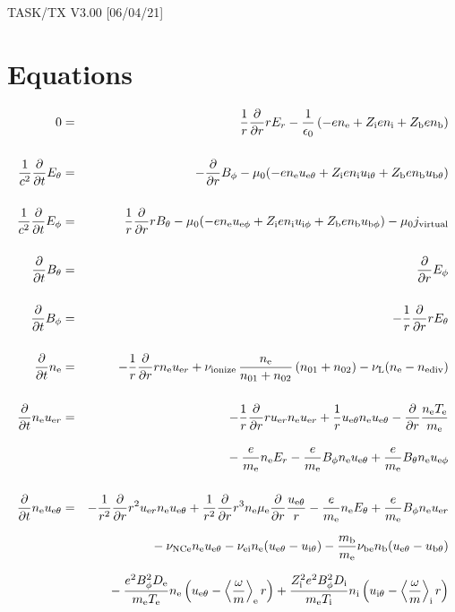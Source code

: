 \documentclass[11pt]{article}
\def\r#1{{\rm#1}}
\def\ddt{\frac{\partial}{\partial t}}
\def\ddr{\frac{\partial}{\partial r}}
\def\ave#1{\left\langle#1\right\rangle}
\def\me{m_\r{e}}
\def\mb{m_\r{b}}
\def\mue{\mu_\r{e}}
\def\De{D_\r{e}}
\def\Di{D_\r{i}}
\def\ne{n_\r{e}}
\def\ni{n_\r{i}}
\def\nb{n_\r{b}}
\def\uer{u_{\r{e}r}}
\def\ueth{u_{\r{e}\theta}}
\def\uith{u_{\r{i}\theta}}
\def\ubth{u_{\r{b}\theta}}
\def\ueph{u_{\r{e}\phi}}
\def\uiph{u_{\r{i}\phi}}
\def\ubph{u_{\r{b}\phi}}
\def\Er{E_r}
\def\Eth{E_\theta}
\def\Eph{E_\phi}
\def\Bth{B_\theta}
\def\Bph{B_\phi}
\def\Te{T_\r{e}}
\def\Ti{T_\r{i}}
\def\nna{n_{01}}
\def\nnb{n_{02}}
\def\Zi{Z_\r{i}}
\def\Zb{Z_\r{b}}
\def\nuNCe{\nu_\r{NCe}}
\def\nuL{\nu_\r{L}}
\def\nuion{\nu_\r{ionize}}
\def\nediv{n_\r{ediv}}
\newcommand{\Frac}[2]{%
  {\displaystyle {\displaystyle #1\over \displaystyle #2}}%
}
\newcommand{\rdprd}[2]{\Frac{\partial #1}{\partial #2}}
\newcommand{\aveaveB}[1]{\left< \!\! \left< #1 \right> \!\! \right>}
\begin{document}
\begin{center}
TASK/TX V3.00 [06/04/21]
\end{center}

\section{Equations}
\vspace{-5mm}

\begin{eqnarray}
%
%
  0 &=&
%
  \frac{1}{r} \ddr r \Er
%
 - \frac{1}{\epsilon_0}
  \left(-e \ne + \Zi e \ni + \Zb e \nb \right)
\\[5mm]
%
%
  \frac{1}{c^2} \ddt \Eth &=&
%
  - \ddr \Bph
%
  - \mu_0 (-e \ne \ueth + \Zi e \ni \uith + \Zb e \nb \ubth)
\\[5mm]
%
%
  \frac{1}{c^2} \ddt \Eph &=&
%
  \frac{1}{r} \ddr r \Bth
%
  - \mu_0 (-e \ne \ueph + \Zi e \ni \uiph + \Zb e \nb \ubph) - \mu_0 j_\r{virtual}
\\[5mm]
%
%
  \ddt \Bth &=&
%
  \ddr \Eph
\\[5mm]
%
%
  \ddt \Bph &=&
%
  - \frac{1}{r} \ddr r \Eth
\\[5mm]
%
%
  \ddt\ne &=&
%
  - \frac{1}{r} \ddr r \ne \uer 
%
  + \nuion\, \frac{\ne}{\nna+\nnb}\, (\nna+\nnb)
%
  - \nuL (\ne - \nediv)
\\[5mm]
%
%
  \ddt \ne \uer &=&
%
  - \frac{1}{r} \ddr r \uer \ne \uer
%
  + \frac{1}{r} \ueth \ne \ueth
%
  - \ddr \frac{\ne \Te}{\me}
\nonumber\\[3mm]&&{}
%
  - \frac{e}{\me} \ne \Er
%
  - \frac{e}{\me} \Bph \ne \ueth
%
  + \frac{e}{\me} \Bth \ne \ueph
\\[5mm]
%
%
  \ddt \ne \ueth &=&
%
  - \frac{1}{r^2} \ddr r^2 \uer \ne \ueth
%
  + \frac{1}{r^2} \ddr r^3 \ne \mue \ddr \frac{\ueth}{r}
%
  - \frac{e}{\me} \ne \Eth
%
  + \frac{e}{\me} \Bph \ne \uer
\nonumber\\[2.5mm]&&{}
%
  - \nuNCe \ne \ueth
%
  - \nu_\r{ei} \ne (\ueth - \uith)
%
  - \frac{\mb}{\me} \nu_\r{be} \nb (\ueth - \ubth)
\nonumber\\[2.5mm]&&{}
%
  - \frac{e^2 \Bph^2 \De}{\me\Te}\ne
    \left(\ueth - \ave{\frac{\omega}{m}}_\r{e} r \right)
%
   + \frac{\Zi^2 e^2 \Bph^2 \Di}{\me\Ti}\ni
    \left(\uith - \ave{\frac{\omega}{m}}_\r{i} r \right)
\nonumber\\[2.5mm]&&{}
%

\end{eqnarray}
\end{document}
